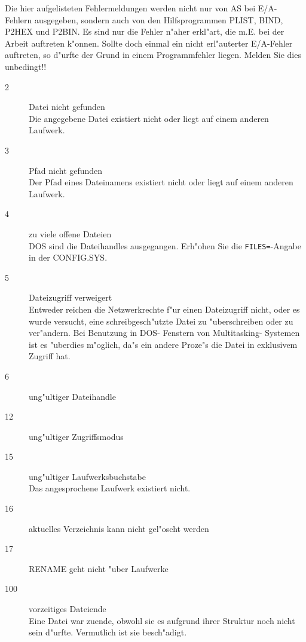 \documentclass[12pt,a4paper,twoside]{report}
\newcommand{\tty}[1]{{\tt #1}}
\newcommand{\asname}{AS}
\begin{document}
Die hier aufgelisteten Fehlermeldungen werden nicht nur von \asname{} bei E/A-
Fehlern ausgegeben, sondern auch von den Hilfsprogrammen PLIST, BIND,
P2HEX und P2BIN.  Es sind nur die Fehler n"aher erkl"art, die m.E. bei
der Arbeit auftreten k"onnen.  Sollte doch einmal ein nicht erl"auterter
E/A-Fehler auftreten, so d"urfte der Grund in einem Programmfehler
liegen.  Melden Sie dies unbedingt!!

\begin{description}
\item[2]{Datei nicht gefunden\\
         Die angegebene Datei existiert nicht oder liegt auf einem
         anderen Laufwerk.}

\item[3]{Pfad nicht gefunden\\
         Der Pfad eines Dateinamens existiert nicht oder liegt auf
         einem anderen Laufwerk.}

\item[4]{zu viele offene Dateien\\
         DOS sind die Dateihandles ausgegangen.  Erh"ohen Sie die
         \tty{FILES=}-Angabe in der CONFIG.SYS.}

\item[5]{Dateizugriff verweigert\\
         Entweder reichen die Netzwerkrechte f"ur einen Dateizugriff
         nicht, oder es wur\-de ver\-sucht, ei\-ne schreib\-ge\-sch"utz\-te Da\-tei
         zu "uber\-schrei\-ben oder zu ver\-"an\-dern.  Bei Benutzung in
         DOS- Fenstern von Multitasking- Systemen ist es "uberdies m"oglich,
         da"s ein andere Proze"s die Datei in exklusivem Zugriff hat.}

\item[6]{ung"ultiger Dateihandle}

\item[12]{ung"ultiger Zugriffsmodus}

\item[15]{ung"ultiger Laufwerksbuchstabe\\
          Das angesprochene Laufwerk existiert nicht.}


\item[16]{aktuelles Verzeichnis kann nicht gel"oscht werden}

\item[17]{RENAME geht nicht "uber Laufwerke}

\item[100]{vorzeitiges Dateiende\\
           Eine Datei war zuende, obwohl sie es aufgrund ihrer Struktur
           noch nicht sein d"urfte.  Vermutlich ist sie besch"adigt.}


\end{description}
\end{document}
